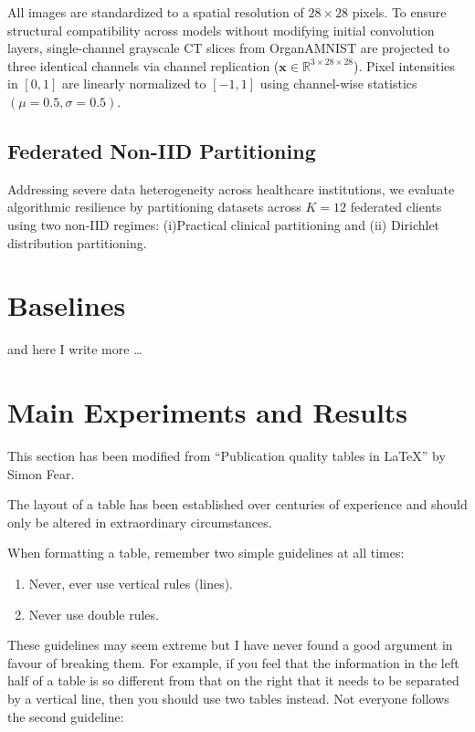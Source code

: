 All images are standardized to a spatial resolution of $28 \times 28$ pixels. To ensure structural compatibility across models without modifying initial convolution layers, single-channel grayscale CT slices from OrganAMNIST are projected to three identical channels via channel replication ($\mathbf{x} \in \mathbb{R}^{3 \times 28 \times 28}$). Pixel intensities in $[0, 1]$ are linearly normalized to $[-1, 1]$ using channel-wise statistics $(\mu = 0.5, \sigma = 0.5)$.

\subsection{Federated Non-IID Partitioning}
Addressing severe data heterogeneity across healthcare institutions, we evaluate algorithmic resilience by partitioning datasets across $K = 12$ federated clients using two non-IID regimes: (i)Practical clinical partitioning and (ii) Dirichlet distribution partitioning.

\section{Baselines}
and here I write more \dots

\section{ Main Experiments and Results}
This section has been modified from ``Publication quality tables in \LaTeX*''
 by Simon Fear.

The layout of a table has been established over centuries of experience and 
should only be altered in extraordinary circumstances. 

When formatting a table, remember two simple guidelines at all times:

\begin{enumerate}
  \item Never, ever use vertical rules (lines).
  \item Never use double rules.
\end{enumerate}

These guidelines may seem extreme but I have
never found a good argument in favour of breaking them. For
example, if you feel that the information in the left half of
a table is so different from that on the right that it needs
to be separated by a vertical line, then you should use two
tables instead. Not everyone follows the second guideline:

